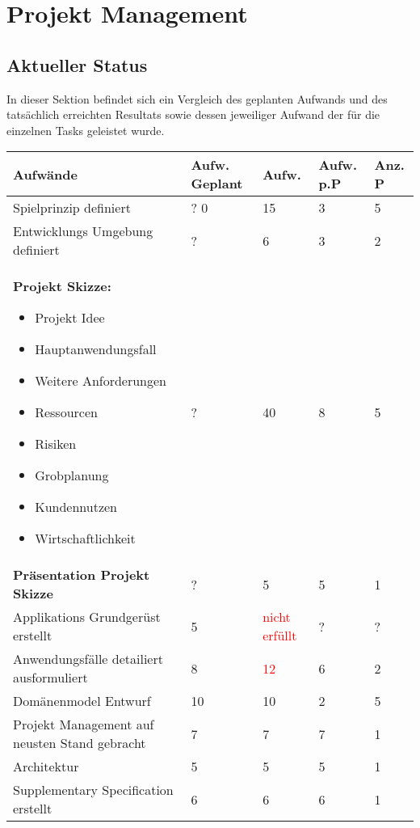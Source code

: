 \section{Projekt Management} \label{sec:Projekt-Management}
\subsection{Aktueller Status} \label{sec:Aktueller-Status}
In dieser Sektion befindet sich ein Vergleich des geplanten Aufwands und des tatsächlich erreichten Resultats sowie dessen jeweiliger Aufwand der für die einzelnen Tasks geleistet wurde.

\begin{table}[htp]
\begin{tabular}{ | p{6.5cm} | l  | l | l | l |}
\hline
\textbf{Aufwände} & \textbf{Aufw. Geplant}  & \textbf{Aufw.} & \textbf{Aufw. p.P} & \textbf{Anz. P} \\ \hline \hline
Spielprinzip definiert & ? 0  & 15 & 3 & 5 \\ \hline
Entwicklungs Umgebung definiert & ?  & 6 & 3 & 2 \\ \hline
\textbf{Projekt Skizze:}
\begin{itemize}
\item Projekt Idee
\item Hauptanwendungsfall
\item Weitere Anforderungen
\item Ressourcen
\item Risiken
\item Grobplanung
\item Kundennutzen
\item Wirtschaftlichkeit 
\end{itemize}& ?   & 40 & 8 & 5 \\ \hline
\textbf{Präsentation Projekt Skizze} & ?  & 5 & 5 & 1 \\ \hline
Applikations Grundgerüst erstellt & 5  & \textcolor{red}{nicht erfüllt} & ? & ? \\ \hline
Anwendungsfälle detailiert ausformuliert & 8  & \textcolor{red}{12} & 6 & 2 \\ \hline
Domänenmodel Entwurf & 10 & 10 & 2 & 5 \\ \hline
Projekt Management auf neusten Stand gebracht  & 7 & 7 & 7 & 1 \\ \hline
Architektur & 5 & 5 & 5 & 1 \\ \hline
Supplementary Specification erstellt & 6  & 6 & 6 & 1 \\ \hline

\end{tabular}
\end{table}
